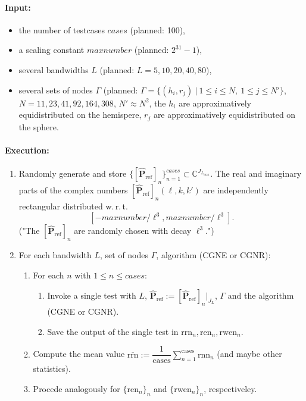 \documentclass[a4paper,twoside,smallheadings,headsepline,11pt,final]{scrartcl}
\newcommand{\C}{\mathbb{C}}
\begin{document}
\paragraph*{Input:}
\begin{itemize}
\item the number of testcases $\mathit{cases}$ (planned: 100),
\item a scaling constant $\mathit{maxnumber}$ (planned: $2^{31}-1$),
\item several bandwidths $L$ (planned: $L = 5, 10, 20, 40, 80$),
\item several sets of nodes $\Gamma$ (planned: $\Gamma = \{(h_i, r_j)\ |\ 1 \leq i \leq N,\ 1 \leq j \leq N'\}$, $N = 11, 23, 41, 92, 164, 308$, $N' \approx N^2$, the $h_i$ are approximatively equidistributed on the hemispere, $r_j$ are approximatively equidistributed on the sphere.
\end{itemize}

\paragraph*{Execution:}
\begin{enumerate}
\item Randomly generate and store $\{[\mathbf{\hat P}_{\mathrm{ref}}]_n\}_{n = 1}^{\mathit{cases}} \subset \C^{J_{L_{\mathrm{max}}}}$.
The real and imaginary parts of the complex numbers $[\mathbf{\hat P}_{\mathrm{ref}}]_n(\ell, k, k')$ are independently rectangular distributed w.\,r.\,t.\ 
\[[-\mathit{maxnumber} / \ell^3, \mathit{maxnumber} / \ell^3].\]
("The $[\mathbf{\hat P}_{\mathrm{ref}}]_n$ are randomly chosen with decay $\ell^3$.")
\item For each bandwidth $L$, set of nodes $\Gamma$, algorithm (CGNE or CGNR):
\begin{enumerate}
\item For each $n$ with $1 \leq n \leq \mathit{cases}$:
\begin{enumerate}
\item Invoke a single test with $L$, $\mathbf{\hat P}_{\mathrm{ref}} := [\mathbf{\hat P}_{\mathrm{ref}}]_n \Bigr|_{J_L}$, $\Gamma$ and the algorithm (CGNE or CGNR).
\item Save the output of the single test in $\mathrm{rrn}_n, \mathrm{ren}_n, \mathrm{rwen}_n$.
\end{enumerate}
\item Compute the mean value $\overline{\mathrm{rrn}} := \dfrac{1}{\mathrm{cases}}\sum_{n=1}^{\mathrm{cases}} \mathrm{rnn}_n$ (and maybe other statistics).
\item Procede analogously for $\{\mathrm{ren}_n\}_n$ and $\{\mathrm{rwen}_n\}_n$, respectiveley.
\end{enumerate}
\end{enumerate}
\end{document}
